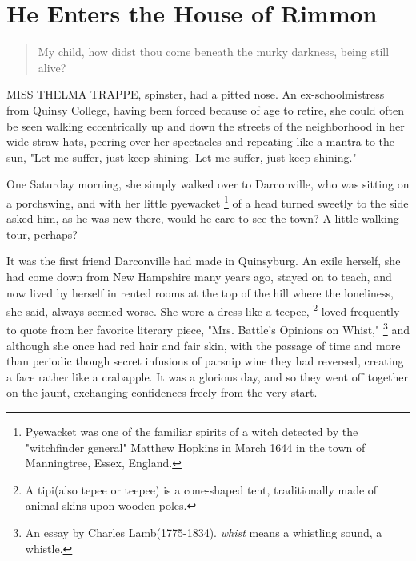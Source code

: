 \chapter{He Enters the House of Rimmon}

\begin{quotation}
My child, how didst thou come beneath the murky darkness, being still alive?\\
\end{quotation}
\vspace{0.2cm}

MISS THELMA TRAPPE, spinster, 
had a pitted 
nose. An ex-schoolmistress from
Quinsy College, having been forced because of age to retire, she could often be
seen walking eccentrically up and down the streets of the neighborhood in her
wide straw hats, peering over her spectacles and repeating like a mantra 
to the sun, "Let me suffer, just keep shining. Let me suffer, just keep shining."

  One Saturday morning, she simply walked over to Darconville, who was sitting
on a porchswing, and with her little pyewacket 
\footnote{Pyewacket was one of the familiar spirits of a witch detected by the
"witchfinder general" Matthew Hopkins in March 1644 in the town of Manningtree,
Essex, England.}
of a head turned sweetly to the
side asked him, as he was new there, would he care to see the town? A little
walking tour, perhaps?

  It was the first friend Darconville had made in Quinsyburg. An exile herself,
she had come down from New Hampshire many years ago, stayed on to teach, and now
lived by herself in rented rooms at the top of the hill where the loneliness,
she said, always seemed worse. She wore a dress like a teepee, 
\footnote{A tipi(also tepee or teepee) is a cone-shaped tent,
traditionally made of animal skins upon wooden poles.
}
loved frequently
to quote from her favorite literary piece, "Mrs. Battle's Opinions on Whist,"
\footnote{An essay by Charles Lamb(1775-1834). \textit{whist} means a whistling
sound, a whistle.}
and although she once had red hair and fair skin, with the passage of time and
more than periodic though secret infusions of parsnip 
wine they had reversed, creating a face rather like a crabapple. 
It was a glorious day, and so they went off together on the jaunt, 
exchanging confidences freely from the very start.


